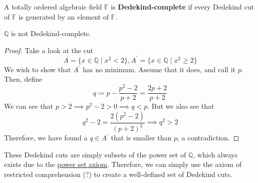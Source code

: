   \begin{definition}
    A totally ordered algebraic field $\mathbb{F}$ is \textbf{Dedekind-complete} if every Dedekind cut of $\mathbb{F}$ is generated by an element of $\mathbb{F}$. 
  \end{definition}

  \begin{lemma}
    $\mathbb{Q}$ is not Dedekind-complete. 
  \end{lemma}
  \begin{proof}
    Take a look at the cut
    \begin{equation}
      A = \{x \in \mathbb{Q} \mid x^2 < 2 \}, A^\prime = \{x \in \mathbb{Q} \mid x^2 \geq 2 \}
    \end{equation}
    We wish to show that $A^\prime$ has no minimum. Assume that it does, and call it $p$. Then, define 
    \begin{equation}
      q \coloneqq p - \frac{p^2 - 2}{p + 2} = \frac{2p + 2}{p + 2} 
    \end{equation}
    We can see that $p > 2 \implies p^2 - 2 > 0 \implies q < p$. But we also see that 
    \begin{equation}
      q^2 - 2 = \frac{2 (p^2 - 2)}{(p + 2)^2} \implies q^2 > 2
    \end{equation}
    Therefore, we have found a $q \in A^\prime$ that is smaller than $p$, a contradiction. 
  \end{proof}

  These Dedekind cuts are simply subsets of the power set of $\mathbb{Q}$, which always exists due to the \hyperref[st-power-set-axiom]{power set axiom}. Therefore, we can simply use the axiom of restricted comprehension (?) to create a well-defined set of Dedekind cuts.    

